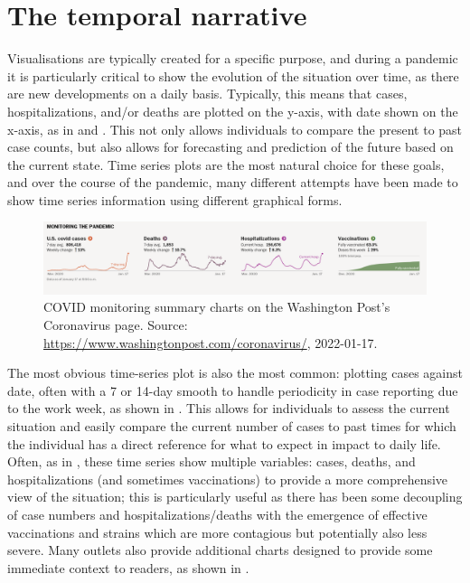 \documentclass[article]{jdssv}\usepackage[]{graphicx}\usepackage[]{xcolor}
\begin{document}




\section{The temporal narrative}

Visualisations are typically created for a specific purpose, and during a pandemic it is particularly critical to show the evolution of the situation over time, as there are new developments on a daily basis. 
Typically, this means that cases, hospitalizations, and/or deaths are plotted on the y-axis, with date shown on the x-axis, as in  and . 
This not only allows individuals to compare the present to past case counts, but also allows for forecasting and prediction of the future based on the current state. 
Time series plots are the most natural choice for these goals, and over the course of the pandemic, many different attempts have been made to show time series information using different graphical forms. 

\begin{figure}
\centering
\includegraphics[width=.99\linewidth]{wapo-covid-monitoring}
\caption{COVID monitoring summary charts on the Washington Post's Coronavirus page. Source: \url{https://www.washingtonpost.com/coronavirus/}, 2022-01-17.}
\label{fig:wapo-covid-time-series}
\end{figure}

The most obvious time-series plot is also the most common: plotting cases against date, often with a 7 or 14-day smooth to handle periodicity in case reporting due to the work week, as shown in . This allows for individuals to assess the current situation and easily compare the current number of cases to past times for which the individual has a direct reference for what to expect in impact to daily life. Often, as in , these time series show multiple variables: cases, deaths, and hospitalizations (and sometimes vaccinations) to provide a more comprehensive view of the situation; this is particularly useful as there has been some decoupling of case numbers and hospitalizations/deaths with the emergence of effective vaccinations and strains which are more contagious but potentially also less severe. Many outlets also provide additional charts designed to provide some immediate context to readers, as shown in . 
\end{document}
